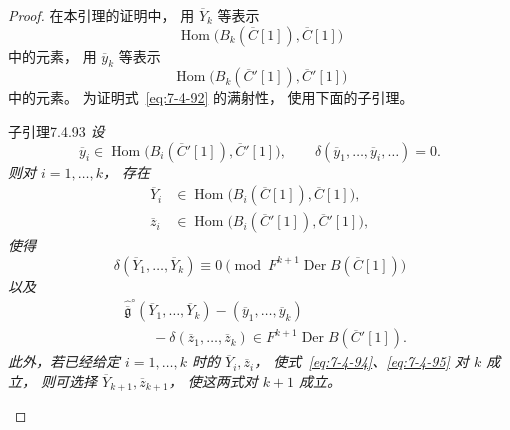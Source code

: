 \begin{proof}
在本引理的证明中，
用 $\overline Y_k$ 等表示
\[
\operatorname{Hom}\bigl(
B_k(\overline C[1]),
\overline C[1]
\bigr)
\]
中的元素，
用 $\overline y_k$ 等表示
\[
\operatorname{Hom}\bigl(
B_k(\overline C'[1]),
\overline C'[1]
\bigr)
\]
中的元素。
为证明式~\eqref{eq:7-4-92} 的满射性，
使用下面的子引理。

\begin{statement}{子引理}{7.4.93}\label{sublem:7-4-93}\itshape
设
\[
\overline y_i\in
\operatorname{Hom}\bigl(
B_i(\overline C'[1]),
\overline C'[1]
\bigr),
\qquad
\delta(\overline y_1,\ldots,\overline y_i,\ldots)=0.
\]
则对 $i=1,\ldots,k$，
存在
\[
\begin{aligned}
\overline Y_i&\in
\operatorname{Hom}\bigl(
B_i(\overline C[1]),
\overline C[1]
\bigr),\\
\overline z_i&\in
\operatorname{Hom}\bigl(
B_i(\overline C'[1]),
\overline C'[1]
\bigr),
\end{aligned}
\]
使得
\begin{equation}
\delta(\overline Y_1,\ldots,\overline Y_k)
\equiv0
\pmod{F^{k+1}\operatorname{Der}B(\overline C[1])}
\tag{7.4.94}\label{eq:7-4-94}
\end{equation}
以及
\begin{equation}
\begin{aligned}
&\widehat{\overline{\mathfrak g}}^{\circ}
(\overline Y_1,\ldots,\overline Y_k)
-(\overline y_1,\ldots,\overline y_k)\\
&\qquad
-\delta(\overline z_1,\ldots,\overline z_k)
\in F^{k+1}\operatorname{Der}B(\overline C'[1]).
\end{aligned}
\tag{7.4.95}\label{eq:7-4-95}
\end{equation}
此外，若已经给定
$i=1,\ldots,k$ 时的
$\overline Y_i,\overline z_i$，
使式~\eqref{eq:7-4-94}、\eqref{eq:7-4-95}
对 $k$ 成立，
则可选择
$\overline Y_{k+1},\overline z_{k+1}$，
使这两式对 $k+1$ 成立。
\end{statement}


\end{proof}
